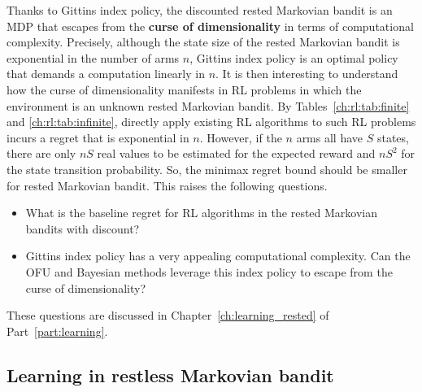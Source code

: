 Thanks to Gittins index policy, the discounted rested Markovian bandit is an MDP that escapes from the \textbf{curse of dimensionality} in terms of computational complexity.
Precisely, although the state size of the rested Markovian bandit is exponential in the number of arms $n$, Gittins index policy is an optimal policy that demands a computation linearly in $n$.
It is then interesting to understand how the curse of dimensionality manifests in RL problems in which the environment is an unknown rested Markovian bandit.
By Tables~\ref{ch:rl:tab:finite} and \ref{ch:rl:tab:infinite}, directly apply existing RL algorithms to such RL problems incurs a regret that is exponential in $n$.
However, if the $n$ arms all have $S$ states, there are only $nS$ real values to be estimated for the expected reward and $nS^2$ for the state transition probability.
So, the minimax regret bound should be smaller for rested Markovian bandit.
This raises the following questions.
\begin{itemize}
    \item What is the baseline regret for RL algorithms in the rested Markovian bandits with discount?
    \item Gittins index policy has a very appealing computational complexity. Can the OFU and Bayesian methods leverage this index policy to escape from the curse of dimensionality?
\end{itemize}
These questions are discussed in Chapter~\ref{ch:learning_rested} of Part~\ref{part:learning}.

\subsection{Learning in restless Markovian bandit}

